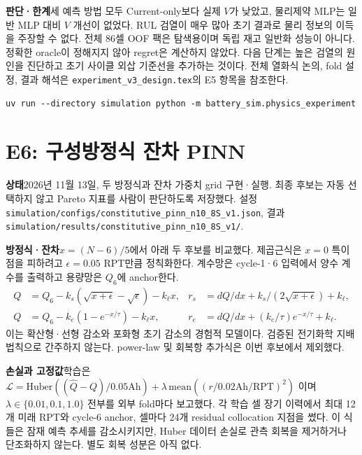 \documentclass[11pt,a4paper]{article}
\newcommand{\file}[1]{{\small\nolinkurl{#1}}}
\begin{document}
\textbf{판단·한계}\quad 세 예측 방법 모두 Current-only보다 실제 $V$가 낮았고, 물리제약 MLP는 일반 MLP 대비 $V$ 개선이 없었다. RUL 검열이 매우 많아 초기 결과로 물리 정보의 이득을 주장할 수 없다. 전체 86셀 OOF 팩은 탐색용이며 독립 재고 일반화 성능이 아니다. 정확한 oracle이 정해지지 않아 regret은 계산하지 않았다. 다음 단계는 높은 검열의 원인을 진단하고 초기 사이클 외삽 기준선을 추가하는 것이다. 전체 열화식 논의, fold 설정, 결과 해석은 \file{experiment_v3_design.tex}의 E5 항목을 참조한다.

\begin{Verbatim}[fontsize=\small]
uv run --directory simulation python -m battery_sim.physics_experiment
\end{Verbatim}
\clearpage
\section{E6: 구성방정식 잔차 PINN}
\textbf{상태}\quad 2026년 11월 13일, 두 방정식과 잔차 가중치 grid 구현·실행. 최종 후보는 자동 선택하지 않고 Pareto 지표를 사람이 판단하도록 저장했다. 설정 \file{simulation/configs/constitutive_pinn_n10_8S_v1.json}, 결과 \file{simulation/results/constitutive_pinn_n10_8S_v1/}.

\textbf{방정식·잔차}\quad $x=(N-6)/5$에서 아래 두 후보를 비교했다. 제곱근식은 $x=0$ 특이점을 피하려고 $\epsilon=0.05$ RPT만큼 정칙화한다. 계수망은 cycle-1·6 입력에서 양수 계수를 출력하고 용량망은 $Q_6$에 anchor한다.
\[
\begin{aligned}
Q&=Q_6-k_s(\sqrt{x+\epsilon}-\sqrt{\epsilon})-k_\ell x, &
r_s&=dQ/dx+k_s/(2\sqrt{x+\epsilon})+k_\ell,\\
Q&=Q_6-k_e(1-e^{-x/\tau})-k_\ell x, &
r_e&=dQ/dx+(k_e/\tau)e^{-x/\tau}+k_\ell.
\end{aligned}
\]
이는 확산형·선형 감소와 포화형 초기 감소의 경험적 모델이다. 검증된 전기화학 지배법칙으로 간주하지 않는다. power-law 및 회복항 추가식은 이번 후보에서 제외했다.

\textbf{손실과 고정값}\quad 학습은
$\mathcal L=\mathrm{Huber}((\hat Q-Q)/0.05\mathrm{Ah})+
\lambda\,\mathrm{mean}((r/0.02\mathrm{Ah/RPT})^2)$
이며 $\lambda\in\{0.01,0.1,1.0\}$ 전부를 외부 fold마다 보고했다. 각 학습 셀 장기 이력에서 최대 12개 미래 RPT와 cycle-6 anchor, 셀마다 24개 residual collocation 지점을 썼다. 이 식들은 잠재 예측 추세를 감소시키지만, Huber 데이터 손실로 관측 회복을 제거하거나 단조화하지 않는다. 별도 회복 성분은 아직 없다.
\end{document}
